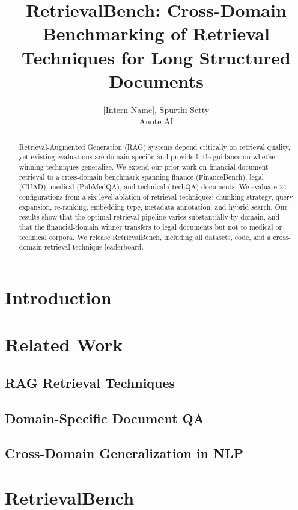 \documentclass{article}
\title{RetrievalBench: Cross-Domain Benchmarking of Retrieval Techniques for Long Structured Documents}
\author{[Intern Name], Spurthi Setty \\
Anote AI}
\date{}
\begin{document}
\maketitle

\begin{abstract}
\noindent
Retrieval-Augmented Generation (RAG) systems depend critically on retrieval quality, yet existing evaluations are domain-specific and provide little guidance on whether winning techniques generalize. We extend our prior work on financial document retrieval \cite{setty2024rag} to a cross-domain benchmark spanning finance (FinanceBench), legal (CUAD), medical (PubMedQA), and technical (TechQA) documents. We evaluate 24 configurations from a six-level ablation of retrieval techniques: chunking strategy, query expansion, re-ranking, embedding type, metadata annotation, and hybrid search. Our results show that the optimal retrieval pipeline varies substantially by domain, and that the financial-domain winner transfers to legal documents but not to medical or technical corpora. We release RetrievalBench, including all datasets, code, and a cross-domain retrieval technique leaderboard.
\end{abstract}

\section{Introduction}

\section{Related Work}
\subsection{RAG Retrieval Techniques}
\subsection{Domain-Specific Document QA}
\subsection{Cross-Domain Generalization in NLP}

\section{RetrievalBench}
\end{document}
